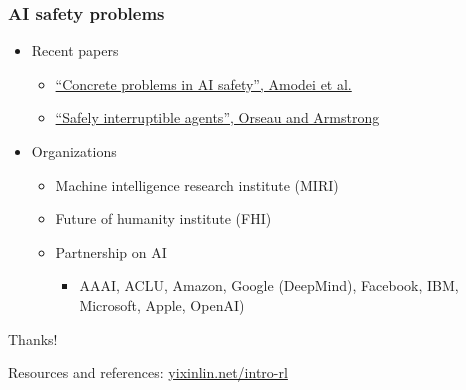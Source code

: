 \documentclass{beamer}
\begin{document}
\begin{frame}
  \frametitle{AI safety problems}

  \begin{itemize}
    \item Recent papers
    \begin{itemize}
      \item \href{https://arxiv.org/abs/1606.06565}{``Concrete problems in AI safety'', Amodei et al.}
      \item \href{https://intelligence.org/files/Interruptibility.pdf}{``Safely interruptible agents'', Orseau and Armstrong}
    \end{itemize}
  \item Organizations
    \begin{itemize}
      \item Machine intelligence research institute (MIRI)
      \item Future of humanity institute (FHI)
      \item Partnership on AI
        \begin{itemize}
          \item AAAI, ACLU, Amazon, Google (DeepMind), Facebook, IBM, Microsoft, Apple, OpenAI)
        \end{itemize}
    \end{itemize}
  \end{itemize}
\end{frame}


\begin{frame}
\Huge{\centerline{Thanks!}}

\Large{\centerline{Resources and references: \href{http://yixinlin.net/intro-rl}{yixinlin.net/intro-rl}}}

\end{frame}

\end{document}
